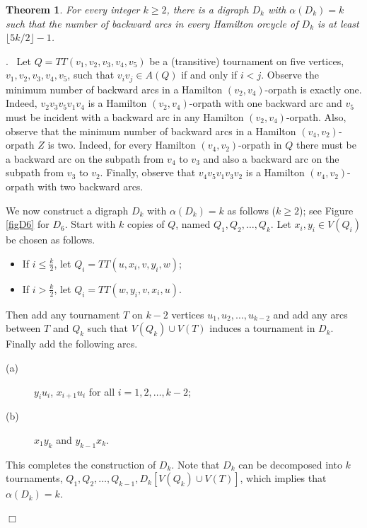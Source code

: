\documentclass{article}
\newcommand{\2}{\vspace{2mm}}
\renewenvironment{proof}[1][]{\par \noindent {\bf Proof#1}.\ }{\hfill$\Box$
\par \vspace{11pt}}
\newtheorem{theorem}{Theorem}[section]
\theoremstyle{definition}
\begin{document}
\begin{theorem}\label{lowbound4k}
For every integer $k\ge 2$, there is a digraph $D_k$ with $\alpha(D_k)=k$ such that the number of backward arcs in every Hamilton orcycle of $D_k$ is at least $\lfloor 5k/2 \rfloor -1$.
\end{theorem}
\begin{proof}
Let $Q=TT(v_1,v_2,v_3,v_4,v_5)$ be a (transitive) tournament on five vertices, $v_1,v_2,v_3,v_4,v_5$, such that $v_iv_j \in A(Q)$ if and only if $i<j$. Observe the minimum number of backward arcs in a Hamilton $(v_2,v_4)$-orpath is exactly one. Indeed, %
$v_2v_3v_5v_1v_4$ is a Hamilton $(v_2,v_4)$-orpath with one backward arc and $v_5$ must be incident with a backward arc in any Hamilton $(v_2,v_4)$-orpath. Also,  observe that the minimum number of backward arcs in a Hamilton $(v_4,v_2)$-orpath $Z$ is two. Indeed, for every Hamilton $(v_4,v_2)$-orpath in $Q$ there must be a backward arc on the subpath from $v_4$ to $v_3$ and also a backward arc on the subpath from $v_3$ to $v_2$.
 Finally, observe that $v_4v_5v_1v_3v_2$ is a Hamilton $(v_4,v_2)$-orpath with two backward arcs.

We now construct a digraph $D_k$ with $\alpha(D_k)=k$ as follows ($k \geq 2$); see Figure \ref{figD6} for $D_6.$
Start with $k$ copies of $Q$, named $Q_1,Q_2,\ldots ,Q_k$. Let $x_i,y_i \in V(Q_i)$ be chosen as follows.
\begin{itemize}
\item If $i \leq \frac{k}{2}$, let $Q_i=TT(u,x_i,v,y_i,w)$; 
\item If $i > \frac{k}{2}$,   let $Q_i=TT(w,y_i,v,x_i,u)$. 
\end{itemize}
Then add any tournament $T$ on $k-2$ vertices $u_1,u_2,\ldots,u_{k-2}$ and add any arcs between $T$ and $Q_k$ such that $V(Q_k) \cup V(T)$ induces a tournament in $D_k$. Finally add the following arcs.
\begin{description}
\item[(a)] $y_i u_i$, $x_{i+1} u_i$ for all $i = 1,2, \ldots , k-2$;
\item[(b)] $x_1 y_k$ and $y_{k-1} x_k$.
\end{description}
This completes the construction of $D_k$. Note that $D_k$ can be decomposed into $k$ tournaments, $Q_1, Q_2, \ldots, Q_{k-1}, D_k[V(Q_k) \cup V(T)]$,
which implies that $\alpha(D_k)=k$.


\end{proof}
\end{document}
